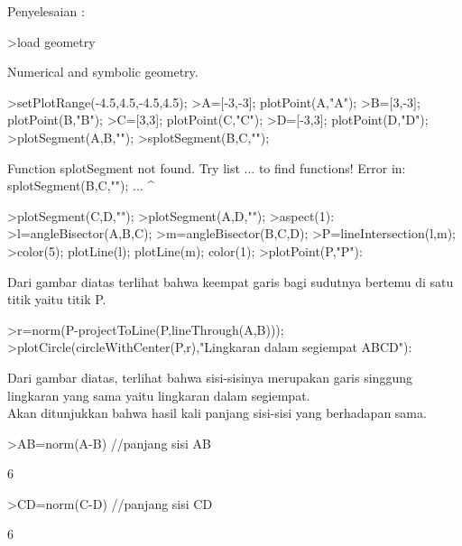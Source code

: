 \documentclass[a4paper,10pt]{article}
\begin{document}
\begin{eulernotebook}
\begin{eulercomment}
\begin{eulercomment}
\begin{eulercomment}
\begin{eulercomment}
\begin{eulercomment}
\begin{eulercomment}
\begin{eulercomment}
\begin{eulercomment}
\begin{eulercomment}
\begin{eulercomment}
\begin{eulercomment}
\begin{eulercomment}
\begin{eulercomment}
\begin{eulercomment}
\begin{eulercomment}
\begin{eulercomment}
\begin{eulercomment}
Penyelesaian :
\end{eulercomment}
\begin{eulerprompt}
>load geometry
\end{eulerprompt}
\begin{euleroutput}
  Numerical and symbolic geometry.
\end{euleroutput}
\begin{eulerprompt}
>setPlotRange(-4.5,4.5,-4.5,4.5);
>A=[-3,-3]; plotPoint(A,"A");
>B=[3,-3]; plotPoint(B,"B");
>C=[3,3]; plotPoint(C,"C");
>D=[-3,3]; plotPoint(D,"D");
>plotSegment(A,B,"");
>splotSegment(B,C,"");
\end{eulerprompt}
\begin{euleroutput}
  Function splotSegment not found.
  Try list ... to find functions!
  Error in:
  splotSegment(B,C,""); ...
                      ^
\end{euleroutput}
\begin{eulerprompt}
>plotSegment(C,D,"");
>plotSegment(A,D,"");
>aspect(1):
>l=angleBisector(A,B,C);
>m=angleBisector(B,C,D);
>P=lineIntersection(l,m);
>color(5); plotLine(l); plotLine(m); color(1);
>plotPoint(P,"P"):
\end{eulerprompt}
\begin{eulercomment}
Dari gambar diatas terlihat bahwa keempat garis bagi sudutnya bertemu
di satu titik yaitu titik P.
\end{eulercomment}
\begin{eulerprompt}
>r=norm(P-projectToLine(P,lineThrough(A,B)));
>plotCircle(circleWithCenter(P,r),"Lingkaran dalam segiempat ABCD"):
\end{eulerprompt}
\begin{eulercomment}
Dari gambar diatas, terlihat bahwa sisi-sisinya merupakan garis
singgung lingkaran yang sama yaitu lingkaran dalam segiempat.\\
Akan ditunjukkan bahwa hasil kali panjang sisi-sisi yang berhadapan
sama.
\end{eulercomment}
\begin{eulerprompt}
>AB=norm(A-B) //panjang sisi AB
\end{eulerprompt}
\begin{euleroutput}
  6
\end{euleroutput}
\begin{eulerprompt}
>CD=norm(C-D) //panjang sisi CD
\end{eulerprompt}
\begin{euleroutput}
  6
\end{euleroutput}
\begin{eulerprompt}

\end{eulerprompt}
\end{eulercomment}
\end{eulercomment}
\end{eulercomment}
\end{eulercomment}
\end{eulercomment}
\end{eulercomment}
\end{eulercomment}
\end{eulercomment}
\end{eulercomment}
\end{eulercomment}
\end{eulercomment}
\end{eulercomment}
\end{eulercomment}
\end{eulercomment}
\end{eulercomment}
\end{eulercomment}
\end{eulernotebook}
\end{document}

